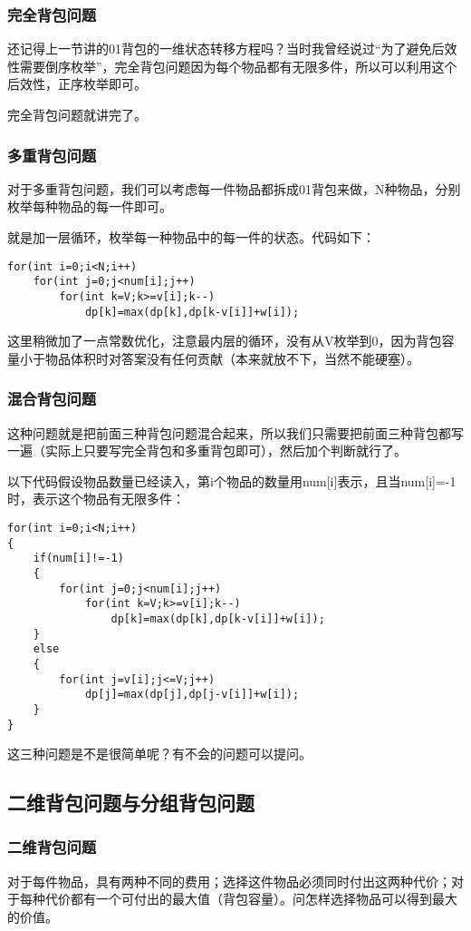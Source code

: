 \subsubsection{完全背包问题}

还记得上一节讲的01背包的一维状态转移方程吗？当时我曾经说过“为了避免后效性需要倒序枚举”，完全背包问题因为每个物品都有无限多件，所以可以利用这个后效性，正序枚举即可。

完全背包问题就讲完了。

\subsubsection{多重背包问题}
对于多重背包问题，我们可以考虑每一件物品都拆成01背包来做，N种物品，分别枚举每种物品的每一件即可。

就是加一层循环，枚举每一种物品中的每一件的状态。代码如下：
\begin{verbatim}
for(int i=0;i<N;i++)
    for(int j=0;j<num[i];j++)
        for(int k=V;k>=v[i];k--) 
            dp[k]=max(dp[k],dp[k-v[i]]+w[i]);
\end{verbatim}

这里稍微加了一点常数优化，注意最内层的循环，没有从V枚举到0，因为背包容量小于物品体积时对答案没有任何贡献（本来就放不下，当然不能硬塞）。

\subsubsection{混合背包问题}
这种问题就是把前面三种背包问题混合起来，所以我们只需要把前面三种背包都写一遍（实际上只要写完全背包和多重背包即可），然后加个判断就行了。

以下代码假设物品数量已经读入，第i个物品的数量用num[i]表示，且当num[i]=-1时，表示这个物品有无限多件：
\begin{verbatim}
for(int i=0;i<N;i++)
{
    if(num[i]!=-1)
    {
        for(int j=0;j<num[i];j++)
            for(int k=V;k>=v[i];k--) 
                dp[k]=max(dp[k],dp[k-v[i]]+w[i]);
	}
    else
    {
        for(int j=v[i];j<=V;j++)
            dp[j]=max(dp[j],dp[j-v[i]]+w[i]);
    }
}
\end{verbatim}

这三种问题是不是很简单呢？有不会的问题可以提问。
\note


\newpage
\subsection{二维背包问题与分组背包问题}
\subsubsection{二维背包问题}
\begin{definition}[二维背包问题]对于每件物品，具有两种不同的费用；选择这件物品必须同时付出这两种代价；对于每种代价都有一个可付出的最大值（背包容量）。问怎样选择物品可以得到最大的价值。\end{definition}

